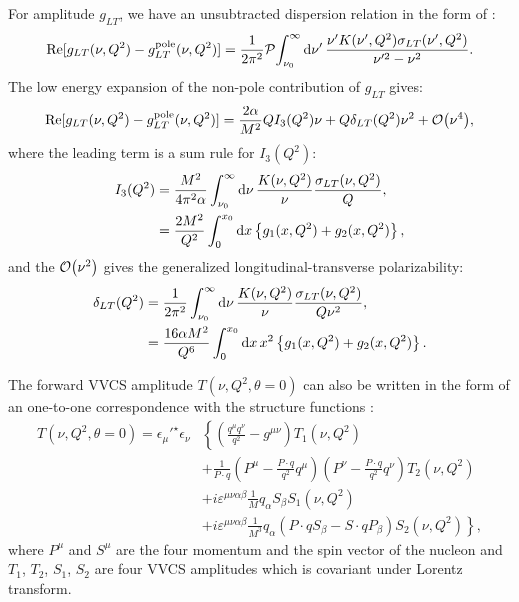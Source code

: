 For amplitude $g_{LT}$, we have an unsubtracted dispersion relation in the form of \cite{Drechsel2003}:
\begin{equation} \label{C2S4SS3E9}
\Re[g_{LT}(\nu,Q^2)-g_{LT}^{\mathrm{pole}}(\nu,Q^2)] = \frac{1}{2\pi^2}\pv{\int_{\nu_0}^\infty\dd{\nu'}\frac{\nu'K(\nu',Q^2)\slt(\nu',Q^2)}{\nu'^2-\nu^2}}.
\end{equation}
The low energy expansion of the non-pole contribution of $g_{LT}$ gives:
\begin{equation} \label{C2S4SS3E10}
\Re[g_{LT}(\nu,Q^2)-g_{LT}^{\mathrm{pole}}(\nu,Q^2)] = \frac{2\alpha}{M^2}QI_3(Q^2)\nu+Q\dlt(Q^2)\nu^2+\order{\nu^4},
\end{equation}
where the leading term is a sum rule for $I_3(Q^2)$:
\begin{equation} \label{C2S4SS3E11}
\begin{split}
I_3(Q^2) & = \frac{M^2}{4\pi^2\alpha}\int_{\nu_0}^\infty\dd{\nu}\frac{K(\nu,Q^2)}{\nu}\frac{\sigma_{LT}(\nu,Q^2)}{Q}, \\
& = \frac{2M^2}{Q^2}\int_0^{x_0}\dd{x}\left\{g_1(x,Q^2)+g_2(x,Q^2)\right\},
\end{split}
\end{equation}
and the $\order{\nu^2}$ gives the generalized longitudinal-transverse polarizability:
\begin{equation} \label{C2S4SS3E12}
\begin{split}
\delta_{LT}(Q^2) & = \frac{1}{2\pi^2}\int_{\nu_0}^\infty\dd{\nu}\frac{K(\nu,Q^2)}{\nu}\frac{\sigma_{LT}(\nu,Q^2)}{Q\nu^2}, \\
& = \frac{16\alpha M^2}{Q^6}\int_0^{x_0}\dd{x}x^2\left\{g_1(x,Q^2)+g_2(x,Q^2)\right\}.
\end{split}
\end{equation}

The forward VVCS amplitude $T(\nu,Q^2,\theta=0)$ can also be written in the form of an one-to-one correspondence with the structure functions \cite{Drechsel2003}:
\begin{equation} \label{C2S4SS3E13}
\begin{split}
T(\nu,Q^2,\theta=0) = \epsilon_\mu'^{\star}\epsilon_\nu & \left\{\left(\frac{q^\mu q^\nu}{q^2}-g^{\mu\nu}\right)T_1(\nu,Q^2)\right. \\
& +\frac{1}{P\cdot q}(P^\mu-\frac{P\cdot q}{q^2}q^\mu)(P^\nu-\frac{P\cdot q}{q^2}q^\nu)T_2(\nu,Q^2) \\
& +i\varepsilon^{\mu\nu\alpha\beta}\frac{1}{M}q_\alpha S_\beta S_1(\nu,Q^2) \\
& \left.+i\varepsilon^{\mu\nu\alpha\beta}\frac{1}{M^3}q_\alpha(P\cdot qS_\beta-S\cdot qP_\beta)S_2(\nu,Q^2)\right\},
\end{split}
\end{equation}
where $P^\mu$ and $S^\mu$ are the four momentum and the spin vector of the nucleon and $T_1$, $T_2$, $S_1$, $S_2$ are four VVCS amplitudes which is covariant under Lorentz transform.

